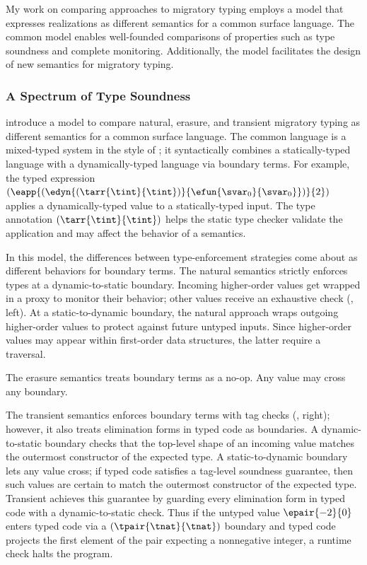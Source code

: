 My work on comparing approaches to migratory typing employs
 a model that expresses realizations as different semantics
 for a common surface language.
The common model enables well-founded comparisons of properties
 such as type soundness and complete monitoring.
Additionally, the model facilitates the design of new semantics for migratory
 typing.


\subsubsection{A Spectrum of Type Soundness}


\citet{gf-icfp-2018} introduce a model to compare natural, erasure, and
 transient migratory typing as different semantics for a common surface
 language.
The common language is a mixed-typed system in the style of \citet{mf-toplas-2009};
 it syntactically combines a statically-typed language with a dynamically-typed
 language via boundary terms.
For example, the typed expression
 $(\eapp{(\edyn{(\tarr{\tint}{\tint})}{\efun{\svar_0}{\svar_0}})}{2})$
 applies a dynamically-typed value to a statically-typed input.
The type annotation $(\tarr{\tint}{\tint})$ helps the static type checker
 validate the application and may affect the behavior of a semantics.

In this model, the differences between type-enforcement strategies
 come about as different behaviors for boundary terms.
The natural semantics strictly enforces types at a dynamic-to-static
 boundary.
Incoming higher-order values get wrapped in a proxy to monitor their
 behavior; other values receive an exhaustive check (, left).
At a static-to-dynamic boundary, the natural approach wraps outgoing
 higher-order values to protect against future untyped inputs.
Since higher-order values may appear within first-order data structures,
 the latter require a traversal.

The erasure semantics treats boundary terms as a no-op.
Any value may cross any boundary.

The transient semantics enforces boundary terms with tag checks (, right);
 however, it also treats elimination forms in typed code as boundaries.
A dynamic-to-static boundary checks that the top-level shape of an incoming
 value matches the outermost constructor of the expected type.
A static-to-dynamic boundary lets any value cross; if typed code satisfies a
 tag-level soundness guarantee, then such values are certain to match the
 outermost constructor of the expected type.
Transient achieves this guarantee by guarding every elimination form in typed
 code with a dynamic-to-static check.
Thus if the untyped value $\epair{{-2}}{{0}}$ enters typed code via a
 $(\tpair{\tnat}{\tnat})$ boundary and typed code projects the first element
 of the pair expecting a nonnegative integer, a runtime check halts the program.

